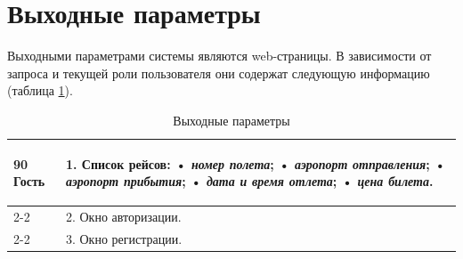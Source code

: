 \section{Выходные параметры}
Выходными параметрами системы являются web-страницы. В зависимости от запроса и текущей роли пользователя они содержат следующую информацию (таблица \ref{tbl:output-data}).

\begin{longtable}{|p{0.5cm}|p{15.5cm}|}
	\caption{Выходные параметры}
	\label{tbl:output-data} \\
	\hline

	\begin{rotatebox}[origin=r]{90}
		{\textbf{Гость}}
	\end{rotatebox}
	&
	1. Список рейсов: \newline
    • \textit{номер полета}; \newline
    • \textit{аэропорт отправления}; \newline
    • \textit{аэропорт прибытия}; \newline
    • \textit{дата и время отлета}; \newline
    • \textit{цена билета}. \\
	\cline{2-2}
    &
  2. Окно авторизации. \\
	\cline{2-2}
    &
	3. Окно регистрации. \\
	\hline


\end{longtable}
